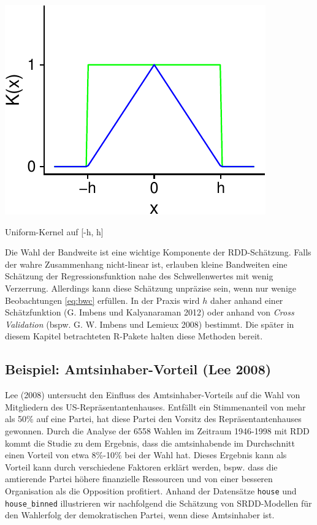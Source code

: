 \documentclass[
  letterpaper,
  DIV=11,
  oneside]{scrreprt}
\begin{document}
\begin{marginfigure}

{\centering \includegraphics{RDD_files/figure-pdf/fig-linearkern-1.pdf}

}

\caption{\label{fig-linearkern}Uniform-Kernel auf {[}-h, h{]}}

\end{marginfigure}

Die Wahl der Bandweite ist eine wichtige Komponente der RDD-Schätzung.
Falls der wahre Zusammenhang nicht-linear ist, erlauben kleine
Bandweiten eine Schätzung der Regressionsfunktion nahe des
Schwellenwertes mit wenig Verzerrung. Allerdings kann diese Schätzung
unpräzise sein, wenn nur wenige Beobachtungen \eqref{eq:bwc} erfüllen.
In der Praxis wird \(h\) daher anhand einer Schätzfunktion (G. Imbens
und Kalyanaraman 2012) oder anhand von \emph{Cross Validation} (bspw. G.
W. Imbens und Lemieux 2008) bestimmt. Die später in diesem Kapitel
betrachteten R-Pakete halten diese Methoden bereit.

\hypertarget{beispiel-amtsinhaber-vorteil-lee2008}{%
\subsection{Beispiel: Amtsinhaber-Vorteil (Lee
2008)}\label{beispiel-amtsinhaber-vorteil-lee2008}}

Lee (2008) untersucht den Einfluss des Amtsinhaber-Vorteils auf die Wahl
von Mitgliedern des US-Repräsentantenhauses. Entfällt ein Stimmenanteil
von mehr als 50\% auf eine Partei, hat diese Partei den Vorsitz des
Repräsentantenhauses gewonnen. Durch die Analyse der 6558 Wahlen im
Zeitraum 1946-1998 mit RDD kommt die Studie zu dem Ergebnis, dass die
amtsinhabende im Durchschnitt einen Vorteil von etwa 8\%-10\% bei der
Wahl hat. Dieses Ergebnis kann als Vorteil kann durch verschiedene
Faktoren erklärt werden, bspw. dass die amtierende Partei höhere
finanzielle Ressourcen und von einer besseren Organisation als die
Opposition profitiert. Anhand der Datensätze \texttt{house} und
\texttt{house\_binned} illustrieren wir nachfolgend die Schätzung von
SRDD-Modellen für den Wahlerfolg der demokratischen Partei, wenn diese
Amtsinhaber ist.
\end{document}
